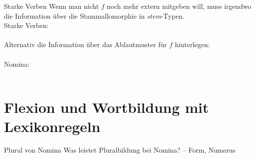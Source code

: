 \begin{frame}
  {Starke Verben}
  \onslide<+->
  \onslide<+->
  Wenn man nicht $f$ noch mehr extern mitgeben will, muss irgendwo\\
  die \alert{Information über die Stammallomorphie} in \textit{stem}-Typen.\\
  \onslide<+->
  \Halbzeile
  \small Starke Verben:\\
  \\
  \onslide<+->
  \Zeile
  \small Alternativ die Information über das Ablautmuster für $f$ hinterlegen:\\
  \\
  \onslide<+->
  \Zeile
  \small Nomina:\\
  \\
  \raggedleft
\end{frame}

\section{Flexion und Wortbildung mit Lexikonregeln}

\begin{frame}
  {Plural von Nomina}
  Was leistet Pluralbildung bei Nomina? \onslide<+-> -- Form, Numerus\\
  \onslide<+->
  \Zeile
  \scalebox{0.8}{%
    \begin{avm}
      \[ \]
    \end{avm}
  }
\end{frame}

